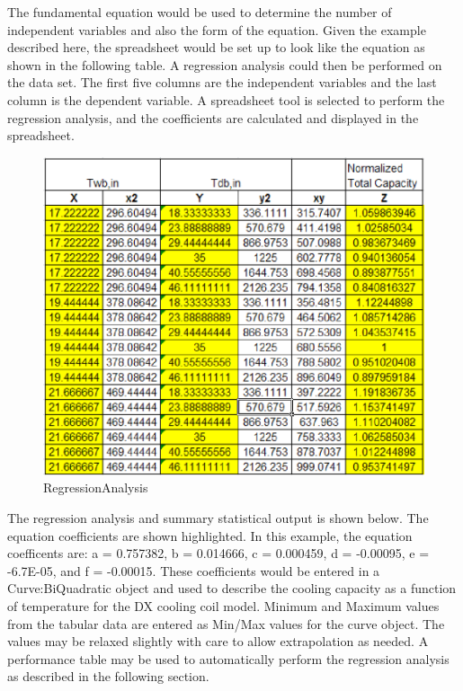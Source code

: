 The fundamental equation would be used to determine the number of independent variables and also the form of the equation. Given the example described here, the spreadsheet would be set up to look like the equation as shown in the following table. A regression analysis could then be performed on the data set. The first five columns are the independent variables and the last column is the dependent variable. A spreadsheet tool is selected to perform the regression analysis, and the coefficients are calculated and displayed in the spreadsheet.

\begin{figure}[htbp]
\centering
\includegraphics{media/image7866.png}
\caption{RegressionAnalysis}
\end{figure}

The regression analysis and summary statistical output is shown below. The equation coefficients are shown highlighted. In this example, the equation coefficents are: a = 0.757382, b = 0.014666, c = 0.000459, d = -0.00095, e = -6.7E-05, and f = -0.00015. These coefficients would be entered in a Curve:BiQuadratic object and used to describe the cooling capacity as a function of temperature for the DX cooling coil model. Minimum and Maximum values from the tabular data are entered as Min/Max values for the curve object. The values may be relaxed slightly with care to allow extrapolation as needed. A performance table may be used to automatically perform the regression analysis as described in the following section.

